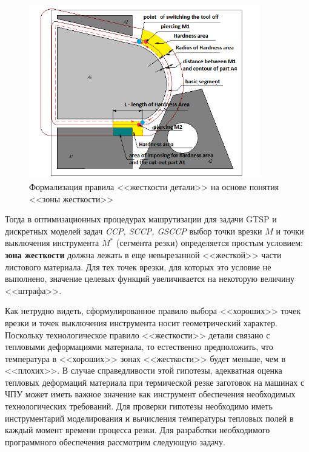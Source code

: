 \documentclass[11pt,twoside,openany]{report}
\begin{document}
\begin{figure}[h]
 \begin{center}
  \includegraphics[width=0.9\textwidth]{hardness-area.png}
  \caption{Формализация правила <<жесткости детали>> на основе понятия <<зоны жесткости>>}
  \label{hardness-area}
  \end{center}
\end{figure}

Тогда в оптимизационных процедурах машрутизации
для задачи GTSP  и дискретных моделей задач {\it CCP, SCCP, GSCCP}
выбор точки врезки $M$
и точки выключения инструмента $M^*$
(сегмента резки) определяется простым условием:
{\bf зона жесткости} должна лежать в еще невырезанной
<<жесткой>> части листового материала.
Для тех точек врезки, для которых это условие не выполнено,
значение целевых функций  увеличивается на некоторую величину
<<штрафа>>.

Как нетрудно видеть,
сформулированное правило выбора <<хороших>> точек врезки
и точек выключения инструмента носит геометрический характер.
Поскольку технологическое правило <<жесткости>> детали
связано с тепловыми деформациями материала,
то естественно предположить,
что температура в <<хороших>> зонах <<жесткости>> будет меньше,
чем в <<плохих>>.
В случае справедливости этой гипотезы,
адекватная оценка тепловых деформаций материала
при термической резке заготовок на машинах с ЧПУ
может иметь важное значение как инструмент
обеспечения необходимых технологических требований.
Для проверки гипотезы необходимо иметь инструментарий
моделирования и вычисления температуры тепловых полей в
каждый момент времени процесса резки.
Для разработки необходимого программного
обеспечения рассмотрим следующую задачу.
\end{document}
